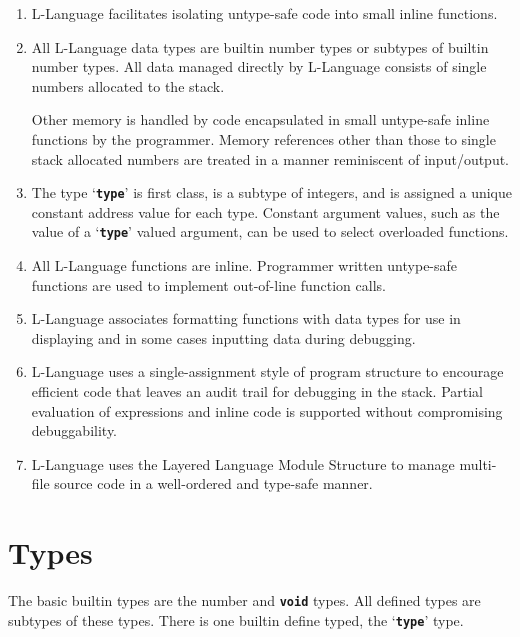 \documentclass[12pt]{article}
\newcommand{\TT}[1]{{\tt \bfseries #1}}
\begin{document}
\begin{enumerate}

\item
L-Language facilitates isolating untype-safe code into small inline functions.

\item
All L-Language data types are builtin number types or subtypes of
builtin number types.  All data managed directly by L-Language consists
of single numbers allocated to the stack.

Other memory is handled by code
encapsulated in small untype-safe inline functions by the programmer.
Memory references other than those to single stack allocated numbers
are treated in a manner reminiscent of input/output.

\item
The type `\TT{type}' is first class, is a subtype of integers, and
is assigned a unique constant address value for each type.  Constant
argument values, such as the value of a `\TT{type}' valued
argument, can be used to select overloaded functions.

\item
All L-Language functions are inline.  Programmer written untype-safe
functions are used to implement out-of-line function calls.

\item
L-Language associates formatting functions
with data types for use in displaying and in some cases inputting
data during debugging.

\item
L-Language uses a single-assignment style of program structure
to encourage
efficient code that leaves an audit trail for debugging in the stack.
Partial evaluation of expressions and inline code is supported without
compromising debuggability.

\item
L-Language uses the Layered Language Module Structure to manage
multi-file source code in a well-ordered and type-safe manner.


\end{enumerate}


\section{Types}
\label{TYPES}

The basic builtin types are the number and \TT{void} types.
All defined types are subtypes of these types.
There is one builtin define typed, the `\TT{type}' type.
\end{document}
